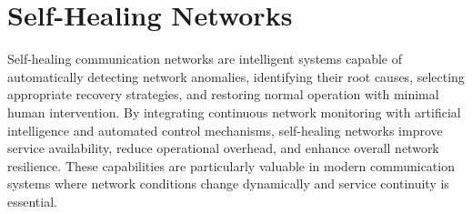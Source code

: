 \documentclass[12pt,a4paper]{report}
\begin{document}

	
	\section{Self-Healing Networks}
	\label{sec:self_healing}
	
	Self-healing communication networks are intelligent systems capable of automatically detecting network anomalies, identifying their root causes, selecting appropriate recovery strategies, and restoring normal operation with minimal human intervention. By integrating continuous network monitoring with artificial intelligence and automated control mechanisms, self-healing networks improve service availability, reduce operational overhead, and enhance overall network resilience. These capabilities are particularly valuable in modern communication systems where network conditions change dynamically and service continuity is essential.
	
\end{document}
